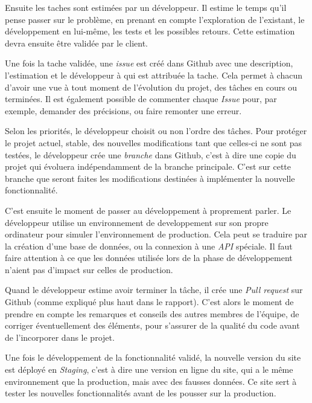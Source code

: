 \documentclass[12pt,a4paper]{article}
\begin{document}
  \bigskip

  Ensuite les taches sont estimées par un développeur. Il estime le temps
  qu'il pense passer sur le problème, en prenant en compte l'exploration
  de l'existant, le développement en lui-même, les tests et les possibles
  retours. Cette estimation devra ensuite être validée par le client.

  \bigskip

  Une fois la tache validée, une \emph{issue} est créé dans Github avec
  une description, l'estimation et le développeur à qui est attribuée la
  tache. Cela permet à chacun d'avoir une vue à tout moment de l'évolution
  du projet, des tâches en cours ou terminées. Il est également possible
  de commenter chaque \emph{Issue} pour, par exemple, demander des
  précisions, ou faire remonter une erreur.

  \bigskip

  Selon les priorités, le développeur choisit ou non l'ordre des tâches.
  Pour protéger le projet actuel, stable, des nouvelles modifications tant
  que celles-ci ne sont pas testées, le développeur crée une
  \emph{branche} dans Github, c'est à dire une copie du projet qui
  évoluera indépendamment de la branche principale. C'est sur cette
  branche que seront faites les modifications destinées à implémenter la
  nouvelle fonctionnalité.

  \bigskip

  C'est ensuite le moment de passer au développement à proprement parler.
  Le développeur utilise un environnement de developpement sur son propre
  ordinateur pour simuler l'environnement de production. Cela peut se
  traduire par la création d'une base de données, ou la connexion à une
  \emph{API} spéciale. Il faut faire attention à ce que les données
  utilisée lors de la phase de développement n'aient pas d'impact sur
  celles de production.

  \bigskip

  Quand le développeur estime avoir terminer la tâche, il crée une
  \emph{Pull request} sur Github (comme expliqué plus haut dans le
  rapport). C'est alors le moment de prendre en compte les remarques et
  conseils des autres membres de l'équipe, de corriger éventuellement des
  éléments, pour s'assurer de la qualité du code avant de l'incorporer
  dans le projet.

  \bigskip

  Une fois le développement de la fonctionnalité validé, la nouvelle
  version du site est déployé en \emph{Staging}, c'est à dire une version
  en ligne du site, qui a le même environnement que la production, mais
  avec des fausses données. Ce site sert à tester les nouvelles
  fonctionnalités avant de les pousser sur la production.
\end{document}
